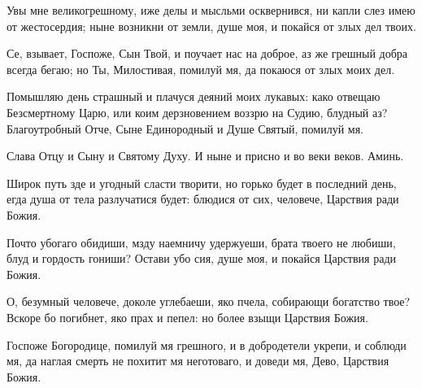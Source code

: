 \begin{mymulticols}
\slava

Увы мне великогрешному, иже делы и мысльми осквернився, ни капли слез имею от жестосердия; ныне возникни от земли, душе моя, и покайся от злых дел твоих.

\inyne

Се, взывает, Госпоже, Сын Твой, и поучает нас на доброе, аз же грешный добра всегда бегаю; но Ты, Милостивая, помилуй мя, да покаюся от злых моих дел.


Помышляю день страшный и плачуся деяний моих лукавых: како отвещаю Безсмертному Царю, или коим дерзновением воззрю на Судию, блудный аз? Благоутробный Отче, Сыне Единородный и Душе Святый, помилуй мя.

Слава Отцу и Сыну и Святому Духу. И ныне и присно и во веки веков. Аминь.





Широк путь зде и угодный сласти творити, но горько будет в последний день, егда душа от тела разлучатися будет: блюдися от сих, человече, Царствия ради Божия.


Почто убогаго обидиши, мзду наемничу удержуеши, брата твоего не любиши, блуд и гордость гониши? Остави убо сия, душе моя, и покайся Царствия ради Божия.

\slava

О, безумный человече, доколе углебаеши, яко пчела, собирающи богатство твое? Вскоре бо погибнет, яко прах и пепел: но более взыщи Царствия Божия.

\inyne

Госпоже Богородице, помилуй мя грешного, и в добродетели укрепи, и соблюди мя, да наглая смерть не похитит мя неготоваго, и доведи мя, Дево, Царствия Божия.




\end{mymulticols}
